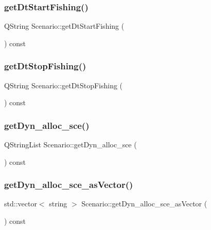 \mbox{\label{class_scenario_a108d4ff35984d4ef397706dbf94917f1}} 
\subsubsection{\texorpdfstring{getDtStartFishing()}{getDtStartFishing()}}
{\footnotesize\ttfamily Q\+String Scenario\+::get\+Dt\+Start\+Fishing (\begin{DoxyParamCaption}{ }\end{DoxyParamCaption}) const}

\mbox{\label{class_scenario_abe62f8d2c3979868ce88a71b9bea9338}} 
\subsubsection{\texorpdfstring{getDtStopFishing()}{getDtStopFishing()}}
{\footnotesize\ttfamily Q\+String Scenario\+::get\+Dt\+Stop\+Fishing (\begin{DoxyParamCaption}{ }\end{DoxyParamCaption}) const}

\mbox{\label{class_scenario_a4a3f15933df62718ca13b64ffee96a08}} 
\subsubsection{\texorpdfstring{getDyn\_alloc\_sce()}{getDyn\_alloc\_sce()}}
{\footnotesize\ttfamily Q\+String\+List Scenario\+::get\+Dyn\+\_\+alloc\+\_\+sce (\begin{DoxyParamCaption}{ }\end{DoxyParamCaption}) const}

\mbox{\label{class_scenario_a5257d6eb2ae4e29020f946cd88641294}} 
\subsubsection{\texorpdfstring{getDyn\_alloc\_sce\_asVector()}{getDyn\_alloc\_sce\_asVector()}}
{\footnotesize\ttfamily std\+::vector$<$ string $>$ Scenario\+::get\+Dyn\+\_\+alloc\+\_\+sce\+\_\+as\+Vector (\begin{DoxyParamCaption}{ }\end{DoxyParamCaption}) const}

